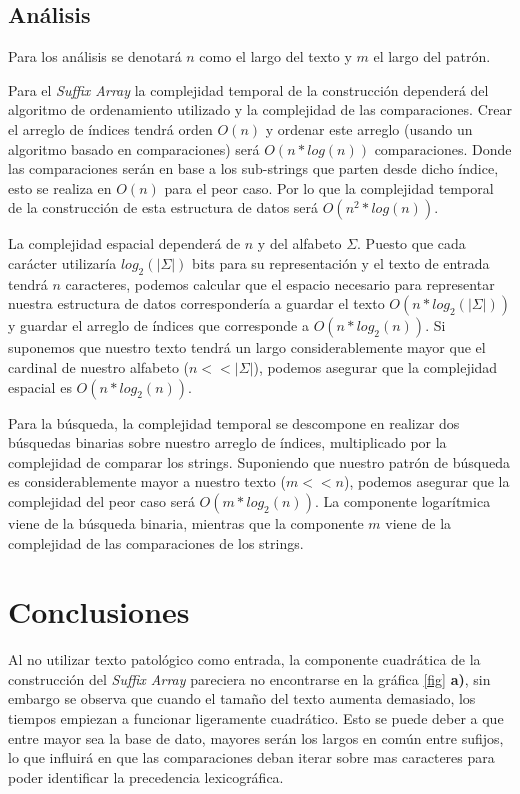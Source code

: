\documentclass[]{article}
\begin{document}
\subsection{Análisis}

Para los análisis se denotará $n$ como el largo del texto y $m$ el largo del patrón.

Para el \emph{Suffix Array} la complejidad temporal de la construcción dependerá del algoritmo de ordenamiento utilizado y la complejidad de las comparaciones. Crear el arreglo de índices tendrá orden $O(n)$ y ordenar este arreglo (usando un algoritmo basado en comparaciones) será $O(n*log(n))$ comparaciones. Donde las comparaciones serán en base a los sub-strings que parten desde dicho índice, esto se realiza en $O(n)$ para el peor caso. Por lo que la complejidad temporal de la construcción de esta estructura de datos será $O(n^{2}*log(n))$. 

La complejidad espacial dependerá de $n$ y del alfabeto $\Sigma$. Puesto que cada carácter utilizaría $log_{2}(|\Sigma|)$ bits para su representación y el texto de entrada tendrá $n$ caracteres, podemos calcular que el espacio necesario para representar nuestra estructura de datos correspondería a guardar el texto $O(n*log_{2}(|\Sigma|))$ y guardar el arreglo de índices que corresponde a $O(n*log_{2}(n))$. Si suponemos que nuestro texto tendrá un largo considerablemente mayor que el cardinal de nuestro alfabeto ($n<<|\Sigma|$), podemos asegurar que la complejidad espacial es $O(n*log_{2}(n))$.

Para la búsqueda, la complejidad temporal se descompone en realizar dos búsquedas binarias sobre nuestro arreglo de índices, multiplicado por la complejidad de comparar los strings. Suponiendo que nuestro patrón de búsqueda es considerablemente mayor a nuestro texto ($m<<n$), podemos asegurar que la complejidad del peor caso será $O(m*log_{2}(n))$. La componente logarítmica viene de la búsqueda binaria, mientras que la componente $m$ viene de la complejidad de las comparaciones de los strings.

\section{Conclusiones}

Al no utilizar texto patológico como entrada, la componente cuadrática de la construcción del \emph{Suffix Array} pareciera no encontrarse en la gráfica \ref{fig} \textbf{a)}, sin embargo se observa que cuando el tamaño del texto aumenta demasiado, los tiempos empiezan a funcionar ligeramente cuadrático. Esto se puede deber a que entre mayor sea la base de dato, mayores serán los largos en común entre sufijos, lo que influirá en que las comparaciones deban iterar sobre mas caracteres para poder identificar la precedencia lexicográfica.
\end{document}
